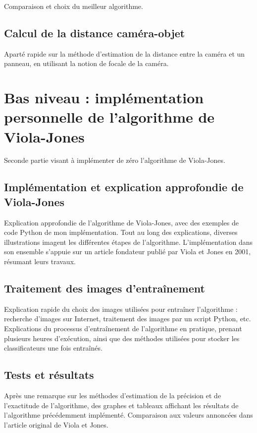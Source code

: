 \documentclass[12pt,a4paper]{article}
\begin{document}
Comparaison et choix du meilleur algorithme.

\subsection{Calcul de la distance caméra-objet}
Aparté rapide sur la méthode d'estimation de la distance entre la caméra et un panneau, en utilisant la notion de focale de la caméra.


\section{Bas niveau : implémentation  personnelle de l’algorithme de Viola-Jones}
Seconde partie visant à implémenter de zéro l'algorithme de Viola-Jones. \\

\subsection{Implémentation et explication approfondie de Viola-Jones}
Explication approfondie de l'algorithme de Viola-Jones, avec des exemples de code Python de mon implémentation. Tout au long des explications, diverses illustrations imagent les différentes étapes de l'algorithme. L'implémentation dans son ensemble s'appuie sur un article fondateur publié par Viola et Jones en 2001, résumant leurs travaux.\\

\subsection{Traitement des images d’entraînement}
Explication rapide du choix des images utilisées pour entraîner l'algorithme : recherche d'images sur Internet, traitement des images par un script Python, etc. \\

Explications du processus d'entraînement de l'algorithme en pratique, prenant plusieurs heures d'exécution, ainsi que des méthodes utilisées pour stocker les classificateurs une fois entraînés.

\subsection{Tests et résultats}
Après une remarque sur les méthodes d'estimation de la précision et de l'exactitude de l'algorithme, des graphes et tableaux affichant les résultats de l'algorithme précédemment implémenté. Comparaison aux valeurs annoncées dans l'article original de Viola et Jones.
\end{document}
